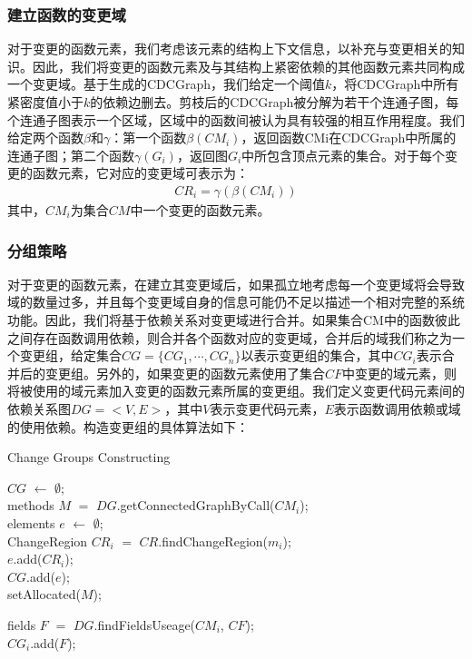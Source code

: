 \subsubsection{建立函数的变更域}
对于变更的函数元素，我们考虑该元素的结构上下文信息，以补充与变更相关的知识。因此，我们将变更的函数元素及与其结构上紧密依赖的其他函数元素共同构成一个变更域。基于生成的CDCGraph，我们给定一个阈值$k$，将CDCGraph中所有紧密度值小于$k$的依赖边删去。剪枝后的CDCGraph被分解为若干个连通子图，每个连通子图表示一个区域，区域中的函数间被认为具有较强的相互作用程度。我们给定两个函数$\beta$和$\gamma$：第一个函数$\beta \left( CM_{i}\right)$，返回函数CMi在CDCGraph中所属的连通子图；第二个函数$\gamma \left( G_{i}\right)$，返回图$G_{i}$中所包含顶点元素的集合。对于每个变更的函数元素，它对应的变更域可表示为：
\begin{align}
CR_{i}=\gamma\left( \beta \left( CM_{i}\right) \right) 
\end{align}
其中，$CM_{i}$为集合$CM$中一个变更的函数元素。

\subsubsection{分组策略}
对于变更的函数元素，在建立其变更域后，如果孤立地考虑每一个变更域将会导致域的数量过多，并且每个变更域自身的信息可能仍不足以描述一个相对完整的系统功能。因此，我们将基于依赖关系对变更域进行合并。如果集合CM中的函数彼此之间存在函数调用依赖，则合并各个函数对应的变更域，合并后的域我们称之为一个变更组，给定集合$CG = \{CG_{1}, \cdots, CG_{n}\}$以表示变更组的集合，其中$CG_{i}$表示合并后的变更组。另外的，如果变更的函数元素使用了集合$CF$中变更的域元素，则将被使用的域元素加入变更的函数元素所属的变更组。我们定义变更代码元素间的依赖关系图$DG = <V, E>$，其中$V$表示变更代码元素，$E$表示函数调用依赖或域的使用依赖。构造变更组的具体算法如下：

\begin{algorithm}[htbp]
\caption{Change Groups Constructing}
\label{alg:ChangeGroups}
    $CG$ $\leftarrow$ $\emptyset$;\\
    {
       {
          methods $M$ $=$ $DG$.getConnectedGraphByCall($CM_{i}$);\\
          elements $e$ $\leftarrow$ $\emptyset$;\\
          {
            ChangeRegion $CR_{i}$ $=$ $CR$.findChangeRegion($m_{i}$);\\
            $e$.add($CR_{i}$);\\
          }
          $CG$.add($e$);\\
          setAllocated($M$);\\
       }
    }

    {
       {
          fields $F$ $=$ $DG$.findFieldsUseage($CM_{i}$, $CF$);\\
          $CG_{i}$.add($F$);\\
       }
    }
\end{algorithm}

